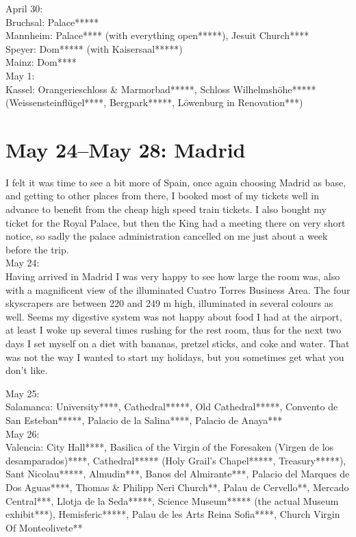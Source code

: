 April 30:\\
Bruchsal: Palace*****\\
Mannheim: Palace**** (with everything open*****), Jesuit Church****\\
Speyer: Dom***** (with Kaisersaal*****)\\
Mainz: Dom****\\

May 1:\\
Kassel: Orangerieschloss \& Marmorbad*****, Schloss Wilhelmsh\"ohe***** (Weissensteinfl\"ugel****, Bergpark*****, L\"owenburg in Renovation***)

\section{May 24--May 28: Madrid}
\label{Madrid2017}

I felt it was time to see a bit more of Spain, once again choosing Madrid as base, and getting to other places from there, I booked most of my tickets well in advance to benefit from the cheap high speed train tickets. I also bought my ticket for the Royal Palace, but then the King had a meeting there on very short notice, so sadly the palace administration cancelled on me just about a week before the trip.\\

May 24:\\
Having arrived in Madrid I was very happy to see how large the room was, also with a magnificent view of the illuminated Cuatro Torres Business Area. The four skyscrapers are between 220 and 249 m high, illuminated in several colours as well. Seems my digestive system was not happy about food I had at the airport, at least I woke up several times rushing for the rest room, thus for the next two days I set myself on a diet with bananas, pretzel sticks, and coke and water. That was not the way I wanted to start my holidays, but you sometimes get what you don't like.

May 25:\\
Salamanca: University****, Cathedral*****, Old Cathedral*****, Convento de San Esteban*****, Palacio de la Salina****, Palacio de Anaya***\\

May 26:\\
Valencia: City Hall****, Basilica of the Virgin of the Foresaken (Virgen de los desamparados)****, Cathedral***** (Holy Grail's Chapel*****, Treasury*****), Sant Nicolau*****, Almudin***, Banos del Almirante***, Palacio del Marques de Dos Aguas****, Thomas \& Philipp Neri Church**, Palau de Cervello**, Mercado Central***, Llotja de la Seda*****, Science Museum***** (the actual Museum exhibit***), Hemisferic*****, Palau de les Arts Reina Sofia****, Church Virgin Of Monteolivete**\\

